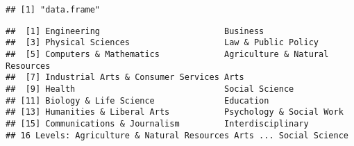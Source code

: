 \documentclass[
]{article}
\newenvironment{Shaded}{\begin{snugshade}}{\end{snugshade}}
\newcommand{\AttributeTok}[1]{\textcolor[rgb]{0.77,0.63,0.00}{#1}}
\newcommand{\DecValTok}[1]{\textcolor[rgb]{0.00,0.00,0.81}{#1}}
\newcommand{\FunctionTok}[1]{\textcolor[rgb]{0.00,0.00,0.00}{#1}}
\newcommand{\NormalTok}[1]{#1}
\newcommand{\OtherTok}[1]{\textcolor[rgb]{0.56,0.35,0.01}{#1}}
\newcommand{\SpecialCharTok}[1]{\textcolor[rgb]{0.00,0.00,0.00}{#1}}
\newcommand{\StringTok}[1]{\textcolor[rgb]{0.31,0.60,0.02}{#1}}
\begin{document}
\begin{verbatim}
## [1] "data.frame"
\end{verbatim}

\begin{Shaded}
\end{Shaded}

\begin{verbatim}
##  [1] Engineering                         Business                           
##  [3] Physical Sciences                   Law & Public Policy                
##  [5] Computers & Mathematics             Agriculture & Natural Resources    
##  [7] Industrial Arts & Consumer Services Arts                               
##  [9] Health                              Social Science                     
## [11] Biology & Life Science              Education                          
## [13] Humanities & Liberal Arts           Psychology & Social Work           
## [15] Communications & Journalism         Interdisciplinary                  
## 16 Levels: Agriculture & Natural Resources Arts ... Social Science
\end{verbatim}

\begin{Shaded}
\end{Shaded}
\end{document}
